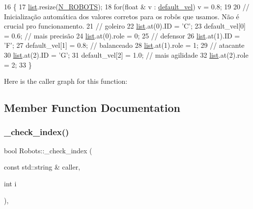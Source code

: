 \begin{DoxyCode}
16                \{
17     \hyperlink{class_robots_a2c6b77265028f82a4342ca1ef15ed305}{list}.resize(\hyperlink{robots_8hpp_a11f808c4481e347f5ea9a10237470606}{N\_ROBOTS});
18     \textcolor{keywordflow}{for}(\textcolor{keywordtype}{float} & v : \hyperlink{class_robots_a6c03d49137645a67d5c5e39bb953a788}{default\_vel}) v = 0.8;
19 
20     \textcolor{comment}{// Inicialização automática dos valores corretos para os robôs que usamos. Não é crucial pro
       funcionamento.}
21     \textcolor{comment}{// goleiro}
22     \hyperlink{class_robots_a2c6b77265028f82a4342ca1ef15ed305}{list}.at(0).ID = \textcolor{charliteral}{'C'};
23     default\_vel[0] = 0.6; \textcolor{comment}{// mais precisão}
24     \hyperlink{class_robots_a2c6b77265028f82a4342ca1ef15ed305}{list}.at(0).role = 0;
25     \textcolor{comment}{// defensor}
26     \hyperlink{class_robots_a2c6b77265028f82a4342ca1ef15ed305}{list}.at(1).ID = \textcolor{charliteral}{'F'};
27     default\_vel[1] = 0.8; \textcolor{comment}{// balanceado}
28     \hyperlink{class_robots_a2c6b77265028f82a4342ca1ef15ed305}{list}.at(1).role = 1;
29     \textcolor{comment}{// atacante}
30     \hyperlink{class_robots_a2c6b77265028f82a4342ca1ef15ed305}{list}.at(2).ID = \textcolor{charliteral}{'G'};
31     default\_vel[2] = 1.0; \textcolor{comment}{// mais agilidade}
32     \hyperlink{class_robots_a2c6b77265028f82a4342ca1ef15ed305}{list}.at(2).role = 2;
33 \}
\end{DoxyCode}
Here is the caller graph for this function\+:


\subsection{Member Function Documentation}
\mbox{\label{class_robots_a30a0a683eeeb90974bc1e1927f97c178}} 
\subsubsection{\texorpdfstring{\+\_\+check\+\_\+index()}{\_check\_index()}}
{\footnotesize\ttfamily bool Robots\+::\+\_\+check\+\_\+index (\begin{DoxyParamCaption}\item[{const std\+::string \&}]{caller,  }\item[{int}]{i }\end{DoxyParamCaption})\hspace{0.3cm}{\ttfamily [static]}, {\ttfamily [private]}}

